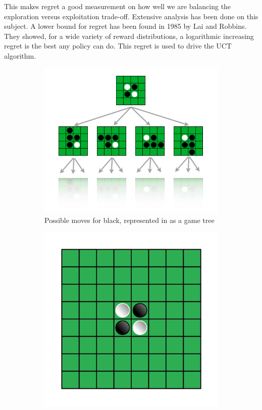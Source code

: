 \documentclass[
11pt, %
english, %
singlespacing, %
headsepline, %
]{MastersDoctoralThesis} %
\begin{document}
This makes regret a good measurement on how well we are balancing the exploration versus exploitation trade-off. Extensive analysis has been done on this subject. A lower bound for regret has been found in 1985 by Lai and Robbins\cite{Lai+Robbins:1985}. They showed, for a wide variety of reward distributions, a logarithmic increasing regret is the best any policy can do. This regret is used to drive the UCT algorithm.

\begin{figure}
	\centering
	\begin{subfigure}{0.4\textwidth}
		\includegraphics[width=\textwidth]{images/othello-gametree}
		\caption{Possible moves for black, represented in as a game tree}
		\label{fig:othello-gametree}
	\end{subfigure}%
	\begin{subfigure}{.4\textwidth}
		\includegraphics[width=\textwidth]{images/startposition}

\end{subfigure}
\end{figure}
\end{document}
